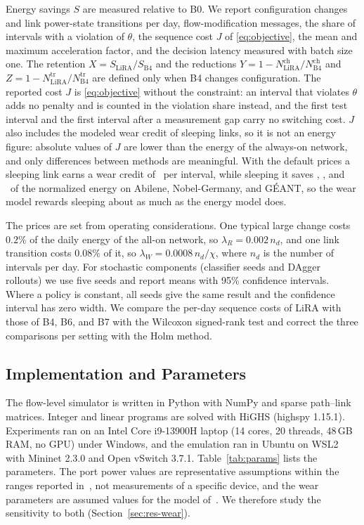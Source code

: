 \documentclass[preprint,12pt]{elsarticle}
\begin{document}
Energy savings $S$ are measured relative to B0. We report configuration changes and link power-state transitions per day, flow-modification messages, the share of intervals with a violation of $\theta$, the sequence cost $J$ of \eqref{eq:objective}, the mean and maximum acceleration factor, and the decision latency measured with batch size one. The retention $X=S_{\mathrm{LiRA}}/S_{\mathrm{B4}}$ and the reductions $Y=1-N^{\mathrm{ch}}_{\mathrm{LiRA}}/N^{\mathrm{ch}}_{\mathrm{B4}}$ and $Z=1-N^{\mathrm{tr}}_{\mathrm{LiRA}}/N^{\mathrm{tr}}_{\mathrm{B4}}$ are defined only when B4 changes configuration. The reported cost $J$ is \eqref{eq:objective} without the constraint: an interval that violates $\theta$ adds no penalty and is counted in the violation share instead, and the first test interval and the first interval after a measurement gap carry no switching cost. $J$ also includes the modeled wear credit of sleeping links, so it is not an energy figure: absolute values of $J$ are lower than the energy of the always-on network, and only differences between methods are meaningful. With the default prices a sleeping link earns a wear credit of \wearCredit\ per interval, while sleeping it saves \sleepSaveabi, \sleepSavenob, and \sleepSavegea\ of the normalized energy on Abilene, Nobel-Germany, and G\'{E}ANT, so the wear model rewards sleeping about as much as the energy model does.

The prices are set from operating considerations. One typical large change costs $0.2\%$ of the daily energy of the all-on network, so $\lambda_R=0.002\,n_d$, and one link transition costs $0.08\%$ of it, so $\lambda_W=0.0008\,n_d/\chi$, where $n_d$ is the number of intervals per day. For stochastic components (classifier seeds and DAgger rollouts) we use five seeds and report means with 95\% confidence intervals. Where a policy is constant, all seeds give the same result and the confidence interval has zero width. We compare the per-day sequence costs of LiRA with those of B4, B6, and B7 with the Wilcoxon signed-rank test and correct the three comparisons per setting with the Holm method.

\subsection{Implementation and Parameters}\label{sec:params}

The flow-level simulator is written in Python with NumPy and sparse path--link matrices. Integer and linear programs are solved with HiGHS (highspy 1.15.1). Experiments ran on an Intel Core i9-13900H laptop (14 cores, 20 threads, 48\,GB RAM, no GPU) under Windows, and the emulation ran in Ubuntu on WSL2 with Mininet 2.3.0 and Open vSwitch 3.7.1. Table~\ref{tab:params} lists the parameters. The port power values are representative assumptions within the ranges reported in~\cite{vishwanath2014modeling,mahadevan2009power}, not measurements of a specific device, and the wear parameters are assumed values for the model of~\cite{chiaraviglio2015lifetime}. We therefore study the sensitivity to both (Section~\ref{sec:res-wear}).
\end{document}
